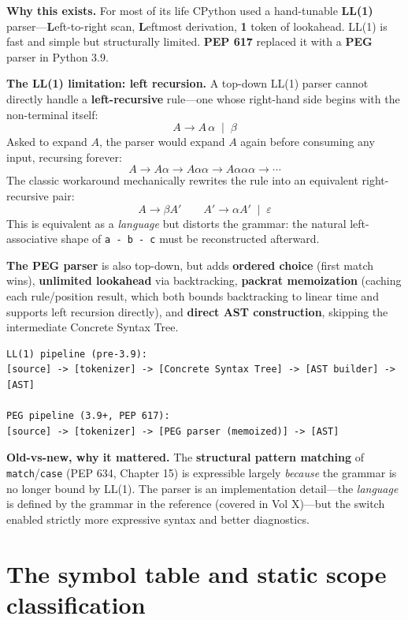 \textbf{Why this exists.} For most of its life CPython used a hand-tunable \textbf{LL(1)}
parser---\textbf{L}eft-to-right scan, \textbf{L}eftmost derivation, \textbf{1} token of
lookahead. LL(1) is fast and simple but structurally limited. \textbf{PEP 617} replaced it
with a \textbf{PEG} parser in Python 3.9.

\textbf{The LL(1) limitation: left recursion.} A top-down LL(1) parser cannot directly
handle a \textbf{left-recursive} rule---one whose right-hand side begins with the
non-terminal itself:
\[ A \rightarrow A\,\alpha \;\mid\; \beta \]
Asked to expand $A$, the parser would expand $A$ again before consuming any input,
recursing forever:
\[ A \rightarrow A\alpha \rightarrow A\alpha\alpha \rightarrow A\alpha\alpha\alpha \rightarrow \cdots \]
The classic workaround mechanically rewrites the rule into an equivalent right-recursive
pair:
\[ A \rightarrow \beta A' \qquad A' \rightarrow \alpha A' \;\mid\; \varepsilon \]
This is equivalent as a \emph{language} but distorts the grammar: the natural
left-associative shape of \texttt{a - b - c} must be reconstructed afterward.

\textbf{The PEG parser} is also top-down, but adds \textbf{ordered choice} (first match
wins), \textbf{unlimited lookahead} via backtracking, \textbf{packrat memoization} (caching
each rule/position result, which both bounds backtracking to linear time and supports left
recursion directly), and \textbf{direct AST construction}, skipping the intermediate Concrete
Syntax Tree.

\begin{lstlisting}[caption={Parser pipelines, old and new}]
LL(1) pipeline (pre-3.9):
[source] -> [tokenizer] -> [Concrete Syntax Tree] -> [AST builder] -> [AST]

PEG pipeline (3.9+, PEP 617):
[source] -> [tokenizer] -> [PEG parser (memoized)] -> [AST]
\end{lstlisting}

\textbf{Old-vs-new, why it mattered.} The \textbf{structural pattern matching} of
\texttt{match}/\texttt{case} (PEP 634, Chapter 15) is expressible largely \emph{because} the
grammar is no longer bound by LL(1). The parser is an implementation detail---the
\emph{language} is defined by the grammar in the reference (covered in Vol X)---but the
switch enabled strictly more expressive syntax and better diagnostics.

\section{The symbol table and static scope classification}

